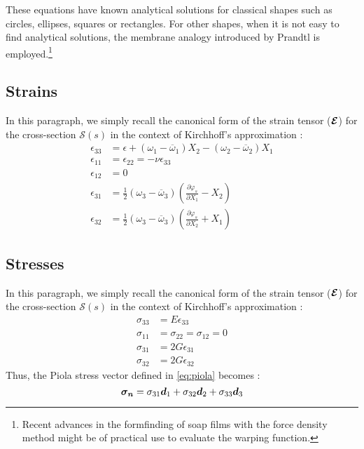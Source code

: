 These equations have known analytical solutions for classical shapes such as circles, ellipses, squares or rectangles. For other shapes, when it is not easy to find analytical solutions, the membrane analogy introduced by Prandtl \cite{Prandtl1903} is employed.\footnote{Recent advances \cite{Koohestani2014} in the formfinding of soap films with the force density method might be of practical use to evaluate the warping function.}

\subsection{Strains}
In this paragraph, we simply recall the canonical form of the strain tensor ($\boldsymbol{\mathcal{E}}$) for the cross-section $\mathcal{S}(s)$ in the context of Kirchhoff's approximation : 
\begin{subequations}
	\begin{alignat}{1}
	\epsilon_{33} &= \epsilon + (\omega_1 - \overbar{\omega}_1) X_2 - (\omega_2 - \overbar{\omega}_2) X_1 \label{eq:strain_a}
	\\
	\epsilon_{11} &=  \epsilon_{22} = -\nu \epsilon_{33}	\label{eq:strain_b}
	\\
	\epsilon_{12} &= 0 \label{eq:strain_c}
	\\
	\epsilon_{31} &= \tfrac{1}{2}(\omega_3 - \overbar{\omega}_3)\left(\frac{\partial \varphi_s}{\partial {X_1}} - X_2 \right) \label{eq:strain_d}
	\\
	\epsilon_{32} &= \tfrac{1}{2}(\omega_3 - \overbar{\omega}_3)\left(\frac{\partial \varphi_s}{\partial {X_2}} + X_1 \right) \label{eq:strain_e}
	\end{alignat}
\end{subequations}

\subsection{Stresses}
In this paragraph, we simply recall the canonical form of the strain tensor ($\boldsymbol{\mathcal{E}}$) for the cross-section $\mathcal{S}(s)$ in the context of Kirchhoff's approximation : 
\begin{subequations}
	\begin{alignat}{1}
	\sigma_{33} &= E \epsilon_{33} \label{eq:stress_a}
	\\
	\sigma_{11} &=  \sigma_{22} = \sigma_{12} = 0 \label{eq:stress_b}
	\\
	\sigma_{31} &= 2G \epsilon_{31}	\label{eq:stress_c}
	\\
	\sigma_{32} &= 2G \epsilon_{32}	\label{eq:stress_d}
	\end{alignat}
\end{subequations}
Thus, the Piola stress vector defined in \cref{eq:piola} becomes :
\begin{equation}
	\boldsymbol{\sigma_n} = \sigma_{31}\boldsymbol{d}_1 + \sigma_{32}\boldsymbol{d}_2 + \sigma_{33}\boldsymbol{d}_3 \label{eq:piola2}
\end{equation}

